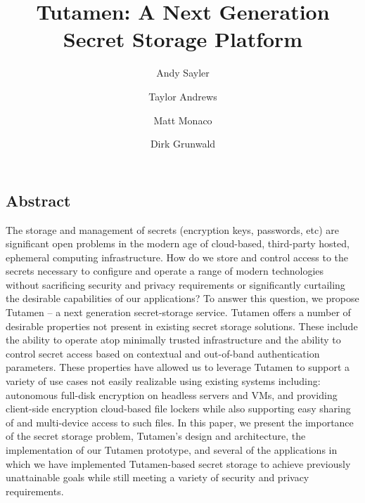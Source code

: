 \documentclass[letterpaper,twocolumn,10pt]{article}
\begin{document}
\date{}

\title{\Large \bf Tutamen: A Next Generation Secret Storage Platform}

\author{Andy Sayler}
\author{Taylor Andrews}
\author{Matt Monaco}
\author{Dirk Grunwald}

\maketitle


\subsection*{Abstract}

The storage and management of secrets (encryption keys, passwords,
etc) are significant open problems in the modern age of cloud-based,
third-party hosted, ephemeral computing infrastructure. How do we
store and control access to the secrets necessary to configure and
operate a range of modern technologies without sacrificing security
and privacy requirements or significantly curtailing the desirable
capabilities of our applications? To answer this question, we propose
Tutamen -- a next generation secret-storage service. Tutamen offers a
number of desirable properties not present in existing secret storage
solutions. These include the ability to operate atop minimally trusted
infrastructure and the ability to control secret access based on
contextual and out-of-band authentication parameters. These properties
have allowed us to leverage Tutamen to support a variety of use cases not
easily realizable using existing systems including: autonomous
full-disk encryption on headless servers and VMs, and providing
client-side encryption cloud-based file lockers while also supporting
easy sharing of and multi-device access to such files. In this paper,
we present the importance of the secret storage problem, Tutamen's
design and architecture, the implementation of our Tutamen prototype,
and several of the applications in which we have implemented
Tutamen-based secret storage to achieve previously unattainable goals
while still meeting a variety of security and privacy requirements.








{
  \footnotesize
  
  
}
\end{document}

